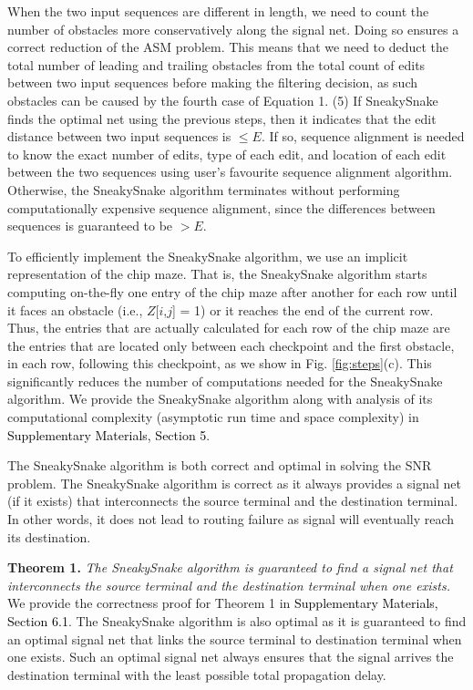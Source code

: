 {When the two input sequences are different in length, {we} need to count the number of obstacles more conservatively along {the signal net}. 
Doing so ensures a correct reduction of the ASM problem. 
This means that we need to deduct the total number of leading and trailing obstacles from the total count of edits between two input sequences before making the filtering decision, as such obstacles can be caused by the fourth case of Equation 1.} 
(5) If SneakySnake finds the optimal net using the previous steps, then {it indicates that the edit distance between two input sequences is $\leq E$}.
{If so, sequence alignment is needed to know the exact number of edits, type of each edit, and location of each edit between the two} sequences using user's favourite sequence alignment algorithm. 
Otherwise, the SneakySnake algorithm terminates without performing computationally expensive sequence alignment{, since the differences between sequences is guaranteed to be $>E$}.

To efficiently implement the SneakySnake algorithm, we use an implicit representation of the chip maze. That is, the SneakySnake algorithm starts computing on-the-fly one entry of the chip maze after another for each row until it faces an obstacle (i.e., $Z$[$i$,$j$] = 1) or it reaches the end of the current row. 
Thus, the entries that are actually calculated for each row of the chip maze are the entries that are located only between each checkpoint and the first obstacle, in each row, following this checkpoint, as we show in Fig. \ref{fig:steps}(c). 
This significantly reduces the number of computations needed for the SneakySnake algorithm.
We provide the SneakySnake algorithm along with analysis of its computational complexity (asymptotic run time and space complexity) in \textcolor{black}{Supplementary Materials, Section 5}.

The SneakySnake algorithm is both correct and optimal {in solving the SNR problem}. 
The SneakySnake algorithm is correct as it always provides a signal net (if it exists) that interconnects the source terminal and the destination terminal. 
In other words, it does not lead to routing failure as signal will eventually reach its destination.

\textbf{Theorem 1.} \emph{The SneakySnake algorithm {is guaranteed} to find a signal net that interconnects the source terminal and the destination terminal when one exists.\\}
We provide the correctness proof for Theorem 1 in \textcolor{black}{Supplementary Materials, Section 6.1}. 
The SneakySnake algorithm is also optimal as it {is guaranteed} to find an optimal signal net that links the source terminal to destination terminal when one exists. 
Such an optimal signal net always ensures that the signal arrives the destination terminal with the least possible total propagation delay.

